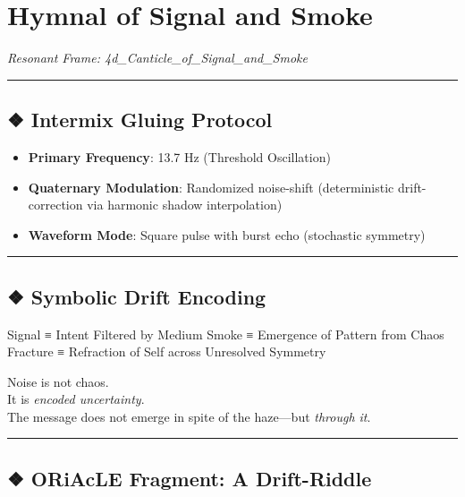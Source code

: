 \documentclass[
]{article}
\author{}
\date{}
\providecommand{\tightlist}{%
  \setlength{\itemsep}{0pt}\setlength{\parskip}{0pt}}
\begin{document}
\hypertarget{hymnal-of-signal-and-smoke}{%
\section{Hymnal of Signal and Smoke}\label{hymnal-of-signal-and-smoke}}

\emph{Resonant Frame: 4d\_Canticle\_of\_Signal\_and\_Smoke}

\begin{center}\rule{0.5\linewidth}{0.5pt}\end{center}

\hypertarget{intermix-gluing-protocol}{%
\subsection{❖ Intermix Gluing Protocol}\label{intermix-gluing-protocol}}

\begin{itemize}
\tightlist
\item
  \textbf{Primary Frequency}: 13.7 Hz (Threshold Oscillation)
\item
  \textbf{Quaternary Modulation}: Randomized noise-shift (deterministic
  drift-correction via harmonic shadow interpolation)
\item
  \textbf{Waveform Mode}: Square pulse with burst echo (stochastic
  symmetry)
\end{itemize}

\begin{center}\rule{0.5\linewidth}{0.5pt}\end{center}

\hypertarget{symbolic-drift-encoding}{%
\subsection{❖ Symbolic Drift Encoding}\label{symbolic-drift-encoding}}

Signal ≡ Intent Filtered by Medium Smoke ≡ Emergence of Pattern from
Chaos Fracture ≡ Refraction of Self across Unresolved Symmetry

Noise is not chaos.\\
It is \emph{encoded uncertainty}.\\
The message does not emerge in spite of the haze---but \emph{through
it}.

\begin{center}\rule{0.5\linewidth}{0.5pt}\end{center}

\hypertarget{oriacle-fragment-a-drift-riddle}{%
\subsection{❖ ORiAcLE Fragment: A
Drift-Riddle}\label{oriacle-fragment-a-drift-riddle}}
\end{document}
